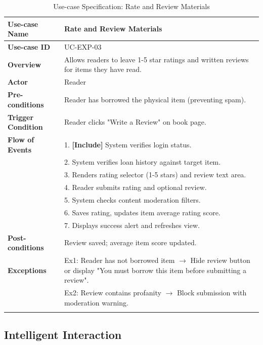 \begin{longtable}{|p{3.5cm}|p{11.5cm}|}
    \hline
    \textbf{Use-case Name} & \textbf{Rate and Review Materials} \\
    \hline
    \textbf{Use-case ID} & UC-EXP-03 \\
    \hline
    \textbf{Overview} & Allows readers to leave 1-5 star ratings and written reviews for items they have read. \\
    \hline
    \textbf{Actor} & Reader \\
    \hline
    \textbf{Pre-conditions} & Reader has borrowed the physical item (preventing spam). \\
    \hline
    \textbf{Trigger Condition} & Reader clicks "Write a Review" on book page. \\
    \hline
    \textbf{Flow of Events} & 
    1. \textbf{[Include]} System verifies login status.\\ 
 & 
    2. System verifies loan history against target item.\\ 
 & 
    3. Renders rating selector (1-5 stars) and review text area.\\ 
 & 
    4. Reader submits rating and optional review.\\ 
 & 
    5. System checks content moderation filters.\\ 
 & 
    6. Saves rating, updates item average rating score.\\ 
 & 
    7. Displays success alert and refreshes view. \\
    \hline
    \textbf{Post-conditions} & Review saved; average item score updated. \\
    \hline
    \textbf{Exceptions} & 
    Ex1: Reader has not borrowed item $\rightarrow$ Hide review button or display "You must borrow this item before submitting a review".\\ 
 & 
    Ex2: Review contains profanity $\rightarrow$ Block submission with moderation warning. \\
    \hline
    \caption{Use-case Specification: Rate and Review Materials} \\
\end{longtable}

\subsection{Intelligent Interaction}

